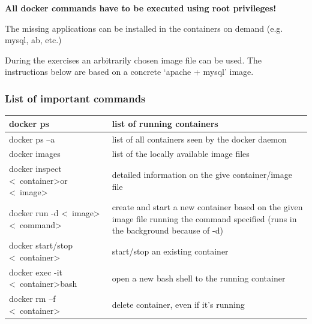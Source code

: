 \documentclass[a4paper]{article}
\begin{document}
\textbf{All docker commands have to be executed using root privileges!}

The missing applications can be installed in the containers on demand (e.g. mysql, ab, etc.)

During the exercises an arbitrarily chosen image file can be used. The instructions below are based on a concrete
`apache + mysql' image.

\subsubsection{List of important commands}
\begin{table}[h]
    \begin{tabularx}{\textwidth}{|l|X|}
        \hline docker ps                                                                     & list of running containers                       \\
        \hline docker ps –a                                                                  & list of all containers seen by the docker daemon \\
        \hline docker images                                                                 & list of the locally available image files        \\
        \hline docker inspect \textless~container\textgreater or \textless~image\textgreater & detailed information on the
        give container/image file                                                                                                               \\
        \hline docker run -d \textless~image\textgreater \textless~command\textgreater       & create and start a new container
        based on the given image file running the command specified (runs in the background because of -d)                                      \\
        \hline docker start/stop \textless~container\textgreater                             & start/stop an existing container                 \\
        \hline docker exec -it \textless~container\textgreater bash                          & open a new bash shell to the running container   \\
        \hline docker rm –f \textless~container\textgreater                                  & delete container, even if it's running           \\
        \hline
    \end{tabularx}
\end{table}
\end{document}
